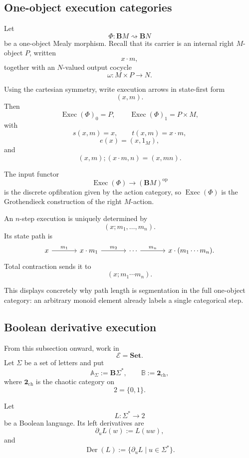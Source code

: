 \subsection{One-object execution categories}
\label{subsec:one-object-execution-categories}

Let
\[
    \Phi:
    \mathbf{B}M\rightsquigarrow\mathbf{B}N
\]
be a one-object Mealy morphism. Recall that its carrier is an internal right
\(M\)-object \(P\), written
\[
    x\cdot m,
\]
together with an \(N\)-valued output cocycle
\[
    \omega:M\times P\to N.
\]

Using the cartesian symmetry, write execution arrows in state-first form
\[
    (x,m).
\]
Then
\[
    \operatorname{Exec}(\Phi)_0=P,
    \qquad
    \operatorname{Exec}(\Phi)_1=P\times M,
\]
with
\[
    s(x,m)=x,
    \qquad
    t(x,m)=x\cdot m,
\]
\[
    e(x)=(x,1_M),
\]
and
\[
    (x,m);(x\cdot m,n)
    =
    (x,mn).
\]

The input functor
\[
    \operatorname{Exec}(\Phi)\to(\mathbf{B}M)^{\mathrm{op}}
\]
is the discrete opfibration given by the action category, so
\(\operatorname{Exec}(\Phi)\) is the Grothendieck construction of the right
\(M\)-action.

An \(n\)-step execution is uniquely determined by
\[
    (x;m_1,\ldots,m_n).
\]
Its state path is
\[
\begin{tikzcd}[column sep=large]
    x
        \arrow[r, "m_1"]
    &
    x\cdot m_1
        \arrow[r, "m_2"]
    &
    \cdots
        \arrow[r, "m_n"]
    &
    x\cdot(m_1\cdots m_n).
\end{tikzcd}
\]
Total contraction sends it to
\[
    (x;m_1\cdots m_n).
\]

This displays concretely why path length is segmentation in the full
one-object category: an arbitrary monoid element already labels a single
categorical step.

\subsection{Boolean derivative execution}
\label{subsec:boolean-derivative-execution}

From this subsection onward, work in
\[
    \mathcal E=\mathbf{Set}.
\]
Let \(\Sigma\) be a set of letters and put
\[
    \mathbb A_\Sigma:=\mathbf{B}\Sigma^\ast,
    \qquad
    \mathbb B:=\mathbf 2_{\mathrm{ch}},
\]
where \(\mathbf 2_{\mathrm{ch}}\) is the chaotic category on
\[
    2=\{0,1\}.
\]

Let
\[
    L:\Sigma^\ast\to2
\]
be a Boolean language. Its left derivatives are
\[
    \partial_uL(w):=L(uw),
\]
and
\[
    \operatorname{Der}(L)
    :=
    \{
        \partial_uL
        \mid
        u\in\Sigma^\ast
    \}.
\]

